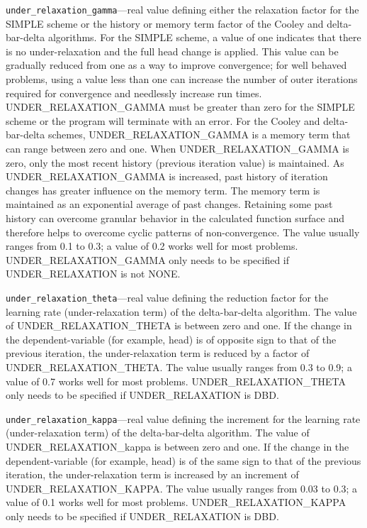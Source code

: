 \begin{description}
\item \texttt{under\_relaxation\_gamma}---real value defining either the relaxation factor for the SIMPLE scheme or the history or memory term factor of the Cooley and delta-bar-delta algorithms. For the SIMPLE scheme, a value of one indicates that there is no under-relaxation and the full head change is applied.  This value can be gradually reduced from one as a way to improve convergence; for well behaved problems, using a value less than one can increase the number of outer iterations required for convergence and needlessly increase run times.  UNDER\_RELAXATION\_GAMMA must be greater than zero for the SIMPLE scheme or the program will terminate with an error.  For the Cooley and delta-bar-delta schemes, UNDER\_RELAXATION\_GAMMA is a memory term that can range between zero and one. When UNDER\_RELAXATION\_GAMMA is zero, only the most recent history (previous iteration value) is maintained. As UNDER\_RELAXATION\_GAMMA is increased, past history of iteration changes has greater influence on the memory term. The memory term is maintained as an exponential average of past changes. Retaining some past history can overcome granular behavior in the calculated function surface and therefore helps to overcome cyclic patterns of non-convergence. The value usually ranges from 0.1 to 0.3; a value of 0.2 works well for most problems. UNDER\_RELAXATION\_GAMMA only needs to be specified if UNDER\_RELAXATION is not NONE.

\item \texttt{under\_relaxation\_theta}---real value defining the reduction factor for the learning rate (under-relaxation term) of the delta-bar-delta algorithm. The value of UNDER\_RELAXATION\_THETA is between zero and one. If the change in the dependent-variable (for example, head) is of opposite sign to that of the previous iteration, the under-relaxation term is reduced by a factor of UNDER\_RELAXATION\_THETA. The value usually ranges from 0.3 to 0.9; a value of 0.7 works well for most problems. UNDER\_RELAXATION\_THETA only needs to be specified if UNDER\_RELAXATION is DBD.

\item \texttt{under\_relaxation\_kappa}---real value defining the increment for the learning rate (under-relaxation term) of the delta-bar-delta algorithm. The value of UNDER\_RELAXATION\_kappa is between zero and one. If the change in the dependent-variable (for example, head) is of the same sign to that of the previous iteration, the under-relaxation term is increased by an increment of UNDER\_RELAXATION\_KAPPA. The value usually ranges from 0.03 to 0.3; a value of 0.1 works well for most problems. UNDER\_RELAXATION\_KAPPA only needs to be specified if UNDER\_RELAXATION is DBD.


\end{description}
